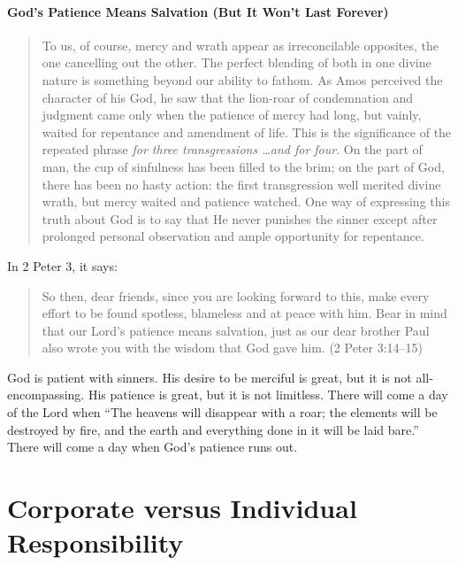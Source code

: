 \paragraph{God's Patience Means Salvation (But It Won't Last Forever)}

\begin{quote}
    To us, of course, mercy and wrath appear as irreconcilable opposites, the
    one cancelling out the other. The perfect blending of both in one divine
    nature is something beyond our ability to fathom. As Amos perceived the
    character of his God, he saw that the lion-roar of condemnation and judgment
    came only when the patience of mercy had long, but vainly, waited for
    repentance and amendment of life. This is the significance of the repeated
    phrase \emph{for three transgressions \dots and for four}. On the part of
    man, the cup of sinfulness has been filled to the brim; on the part of God,
    there has been no hasty action: the first transgression well merited divine
    wrath, but mercy waited and patience watched. One way of expressing this
    truth about God is to say that He never punishes the sinner except after
    prolonged personal observation and ample opportunity for repentance.
    \autocite[30, emphasis original]{motyer:2011}
\end{quote}

In 2 Peter 3, it says:

\begin{quote}
    So then, dear friends, since you are looking forward to this, make every
    effort to be found spotless, blameless and at peace with him. Bear in mind
    that our Lord's patience means salvation, just as our dear brother Paul also
    wrote you with the wisdom that God gave him. (2 Peter 3:14--15)
\end{quote}

God is patient with sinners. His desire to be merciful is great, but it is not
all-encompassing. His patience is great, but it is not limitless. There will
come a day of the Lord when \enquote{The heavens will disappear with a roar; the
elements will be destroyed by fire, and the earth and everything done in it
will be laid bare.} There will come a day when God's patience runs out.


\section{Corporate versus Individual Responsibility}

